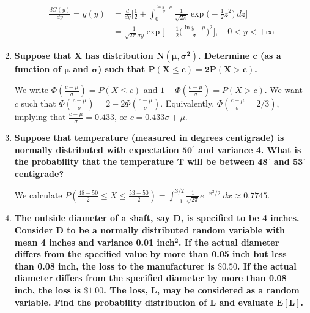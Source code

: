 \documentclass[10pt, oneside]{article}   	%
\theoremstyle{definition}
\begin{document}
\begin{enumerate}[label=9.\arabic*]
\begin{align*}
\frac{d G(y)}{dy} = g(y) &= \frac{d}{dy} \bigg[ \frac{1}{2} + \int^{\frac{\ln y - \mu}{\sigma}}_{0} \frac{1}{\sqrt{2\pi}} \exp \bigg( -\frac{1}{2} z^2 \bigg) \ dz \bigg] \\
&= \boxed{ \frac{1}{\sqrt{2 \pi} \sigma y} \exp \bigg[-\frac{1}{2} \bigg( \frac{\ln y - \mu}{\sigma} \bigg)^2 \bigg], \quad 0 < y < +\infty }
\end{align*}

\item  \begin{tcolorbox}[
  colback=Cerulean!5!white,
  colframe=Cerulean!75!black]
\textbf{Suppose that $\bm{X}$ has distribution $\bm{N(\mu, \sigma^2)}$. Determine $\bm{c}$ (as a function of $\bm{\mu}$ and $\bm{\sigma}$) such that $\bm{P(X \leq c) = 2 P(X > c)}$.}
\end{tcolorbox}

We write $\Phi (\frac{c - \mu}{\sigma}) = P(X \leq c)$ and $1 - \Phi (\frac{c - \mu}{\sigma}) = P(X > c)$. We want $c$ such that $\Phi (\frac{c - \mu}{\sigma}) = 2 - 2 \Phi(\frac{c - \mu}{\sigma})$. Equivalently, $\Phi (\frac{c - \mu}{\sigma} = 2/3)$, implying that $\frac{c - \mu}{\sigma} = 0.433$, or $\boxed{c = 0.433 \sigma + \mu}$.

\item  \begin{tcolorbox}[
  colback=Cerulean!5!white,
  colframe=Cerulean!75!black]
\textbf{Suppose that temperature (measured in degrees centigrade) is normally distributed with expectation $\bm{50^\circ}$ and variance 4. What is the probability that the temperature $\bm{T}$ will be between $\bm{48^\circ}$ and $\bm{53^\circ}$ centigrade?}
\end{tcolorbox}

We calculate $P(\frac{48-50}{2} \leq X \leq \frac{53-50}{2}) = \int^{3/2}_{-1} \frac{1}{\sqrt{2\pi}} e^{-x^2/2} \ dx \approx \boxed{0.7745}$.

\newpage
\item  \begin{tcolorbox}[
  colback=Cerulean!5!white,
  colframe=Cerulean!75!black]
\textbf{The outside diameter of a shaft, say $\bm{D}$, is specified to be 4 inches. Consider $\bm{D}$ to be a normally distributed random variable with mean 4 inches and variance 0.01 inch$\bm{^2}$. If the actual diameter differs from the specified value by more than 0.05 inch but less than 0.08 inch, the loss to the manufacturer is $\bm{\$ 0.50}$. If the actual diameter differs from the specified diameter by more than 0.08 inch, the loss is $\bm{\$ 1.00}$. The loss, $\bm{L}$, may be considered as a random variable. Find the probability distribution of $\bm{L}$ and evaluate $\bm{E[L]}$.}
\end{tcolorbox}


\end{enumerate}
\end{document}

